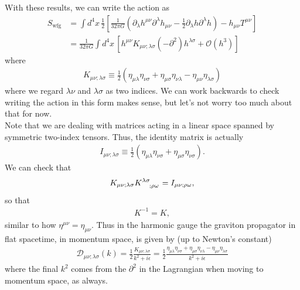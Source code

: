 \documentclass{book}
\theoremstyle{definition}
\newcommand{\p}{\partial}
\newcommand{\nn}{\nonumber}
\newcommand{\f}[2]{\frac{#1}{#2}}
\newcommand{\lp}{\left(}
\newcommand{\rp}{\right)}
\newcommand{\lb}{\left[}
\newcommand{\rb}{\right]}
\newcommand{\D}{\mathcal{D}}
\begin{document}
With these results, we can write the action as
\begin{align}
S_\text{wfg} &= \int d^4x\, \f{1}{2}\lb \f{1}{32\pi G}\lp \p_\lambda h^{\mu\nu} \p^\lambda h_{\mu\nu} - \f{1}{2}\p_\lambda h\p^\lambda h \rp - h_{\mu\nu}T^{\mu\nu} \rb\nn\\
&= \boxed{\f{1}{32\pi G}\int d^4x\, \lb h^{\mu\nu}K_{\mu\nu;\lambda\sigma}(-\p^2)h^{\lambda\sigma} + \mathcal{O}(h^3) \rb}
\end{align}
where
\begin{align}
\boxed{K_{\mu\nu;\lambda\sigma} \equiv \f{1}{2}(\eta_{\mu\lambda}\eta_{\nu\sigma} +\eta_{\mu\sigma}\eta_{\nu\lambda} - \eta_{\mu\nu}\eta_{\lambda\sigma}  )}
\end{align}
where we regard $\lambda\nu$ and $\lambda\sigma$ as two indices. We can work backwards to check writing the action in this form makes sense, but let's not worry too much about that for now.\\

Note that we are dealing with matrices acting in a linear space spanned by symmetric two-index tensors. Thus, the identity matrix is actually
\begin{align}
I_{\mu\nu;\lambda\sigma} \equiv \f{1}{2}(\eta_{\mu\lambda}\eta_{\nu\sigma} + \eta_{\mu\sigma}\eta_{\nu\sigma}).
\end{align}
We can check that
\begin{align}
K_{\mu\nu;\lambda\sigma} \tensor{K}{^{\lambda\sigma}_{;\rho\omega}} = I_{\mu\nu;\rho\omega},
\end{align}
so that
\begin{align}
K^{-1} = K,
\end{align}
similar to how $\eta^{\mu\nu} = \eta_{\mu\nu}$. Thus in the harmonic gauge the graviton propagator in flat spacetime, in momentum space, is given by (up to Newton's constant)
\begin{align}
\boxed{\D_{\mu\nu;\lambda\sigma}(k) = \f{1}{2}\f{K_{\mu\nu;\lambda\sigma}}{k^2 + i\epsilon} = \f{1}{2}\f{\eta_{\mu\lambda}\eta_{\nu\sigma} +\eta_{\mu\sigma}\eta_{\nu\lambda} - \eta_{\mu\nu}\eta_{\lambda\sigma}}{k^2 + i\epsilon}}
\end{align}
where the final $k^2$ comes from the $\p^2$ in the Lagrangian when moving to momentum space, as always.  \\
\end{document}
